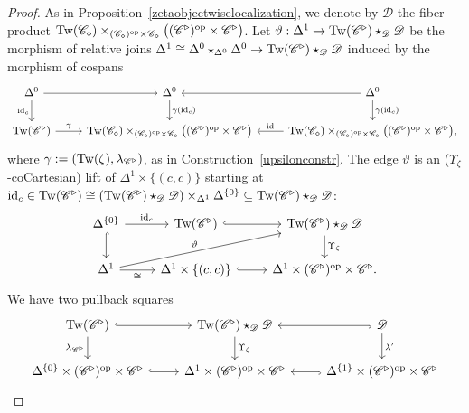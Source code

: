 \documentclass{tac}
\newcommand{\s}[1]{\mathscr{#1}}
\newcommand{\tx}[1]{\textnormal{#1}}
\begin{document}
\begin{proof}
As in Proposition~\ref{zetaobjectwiselocalization}, we denote by $\s{D}$ the fiber product $\tx{Tw}(\s{C}_\diamond) \times_{ (\s{C}_\diamond )^\tx{op} \times \s{C}_\diamond} \big( (\s{C}^\triangleright )^\tx{op}\times \s{C}^\triangleright \big)$.  Let $\vartheta : \Delta^1 \to  \tx{Tw}( \s{C}^\triangleright ) \star_\s{D} \s{D}$ be the morphism of relative joins $\Delta^1 \cong \Delta^0 \star_{\Delta^0} \Delta^0 \to \tx{Tw}( \s{C}^\triangleright ) \star_\s{D} \s{D}$ induced by the morphism of cospans
\[\begin{tikzcd}
\Delta^0 \arrow[]{d}[swap]{\tx{id}_c} \arrow[]{r} & \Delta^0 \arrow[]{d}{\gamma (\tx{id}_c )} & \Delta^0 \arrow[]{l} \arrow[]{d}{\gamma (\tx{id}_c )} \\
\tx{Tw}(\s{C}^\triangleright ) \arrow[]{r}{\gamma} & \tx{Tw}(\s{C}_\diamond) \times_{ (\s{C}_\diamond )^\tx{op} \times \s{C}_\diamond} \big( (\s{C}^\triangleright )^\tx{op}\times \s{C}^\triangleright \big) & \tx{Tw}(\s{C}_\diamond) \times_{ (\s{C}_\diamond )^\tx{op} \times \s{C}_\diamond} \big( (\s{C}^\triangleright )^\tx{op}\times \s{C}^\triangleright \big) \arrow[]{l}[swap]{\tx{id}},
\end{tikzcd}\] 
where $\gamma := (  \tx{Tw}(\zeta ), \lambda_{\s{C}^\triangleright } )$, as in Construction~\ref{upsilonconstr}.  The edge $\vartheta$ is an ($\Upsilon_\zeta$-coCartesian) lift of $\Delta^1 \times \{ (c,c) \}$ starting at $\tx{id}_c \in  \tx{Tw}( \s{C}^\triangleright ) \cong \left( \tx{Tw}( \s{C}^\triangleright ) \star_\s{D} \s{D} \right) \times_{\Delta^1} \Delta^{\{0 \}} \subseteq  \tx{Tw}( \s{C}^\triangleright ) \star_\s{D} \s{D}$:  
\[\begin{tikzcd}
\Delta^{\{0\}} \arrow[hook]{d} \arrow[]{r}{\tx{id}_c} & \tx{Tw}( \s{C}^\triangleright )  \arrow[hook]{r} & \tx{Tw}( \s{C}^\triangleright ) \star_\s{D} \s{D} \arrow[]{d}{\Upsilon_\zeta} \\
\Delta^1 \arrow[]{urr}{\vartheta} \arrow[]{r}[swap]{\cong} & \Delta^1 \times \{ (c,c) \} \arrow[hook]{r} & \Delta^{1} \times (\s{C}^\triangleright )^\tx{op} \times \s{C}^\triangleright .
\end{tikzcd}\]
We have two pullback squares
\[\begin{tikzcd}
\tx{Tw}(\s{C}^\triangleright ) \arrow[hook]{r} \arrow[]{d}[swap]{\lambda_{\s{C}^\triangleright }} & \tx{Tw}( \s{C}^\triangleright ) \star_\s{D} \s{D} \arrow[]{d}{\Upsilon_\zeta} &   \s{D} \arrow[hook]{l} \arrow[]{d}{\lambda'} \\
\Delta^{\{0\}} \times (\s{C}^\triangleright )^\tx{op} \times \s{C}^\triangleright \arrow[hook]{r} & \Delta^{1} \times (\s{C}^\triangleright )^\tx{op} \times \s{C}^\triangleright & \Delta^{\{1\}} \times (\s{C}^\triangleright )^\tx{op} \times \s{C}^\triangleright \arrow[hook]{l}

\end{tikzcd}\]
\end{proof}
\end{document}
